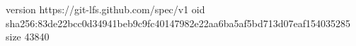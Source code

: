 version https://git-lfs.github.com/spec/v1
oid sha256:83de22bcc0d34941beb9c9fc40147982e22aa6ba5af5bd713d07eaf154035285
size 43840
